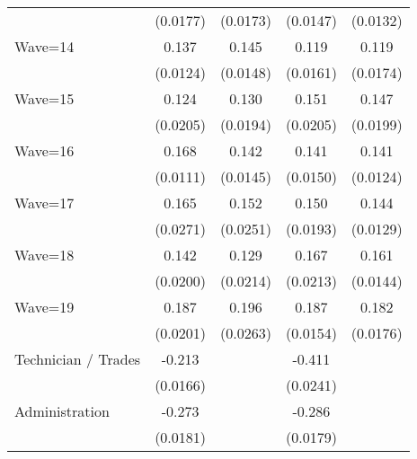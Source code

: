 {\begin{tabular}{l*{4}{c}}
                    &    (0.0177)         &    (0.0173)         &    (0.0147)         &    (0.0132)         \\
[1em]
Wave=14             &       0.137\sym{***}&       0.145\sym{***}&       0.119\sym{***}&       0.119\sym{***}\\
                    &    (0.0124)         &    (0.0148)         &    (0.0161)         &    (0.0174)         \\
[1em]
Wave=15             &       0.124\sym{***}&       0.130\sym{***}&       0.151\sym{***}&       0.147\sym{***}\\
                    &    (0.0205)         &    (0.0194)         &    (0.0205)         &    (0.0199)         \\
[1em]
Wave=16             &       0.168\sym{***}&       0.142\sym{***}&       0.141\sym{***}&       0.141\sym{***}\\
                    &    (0.0111)         &    (0.0145)         &    (0.0150)         &    (0.0124)         \\
[1em]
Wave=17             &       0.165\sym{***}&       0.152\sym{***}&       0.150\sym{***}&       0.144\sym{***}\\
                    &    (0.0271)         &    (0.0251)         &    (0.0193)         &    (0.0129)         \\
[1em]
Wave=18             &       0.142\sym{***}&       0.129\sym{***}&       0.167\sym{***}&       0.161\sym{***}\\
                    &    (0.0200)         &    (0.0214)         &    (0.0213)         &    (0.0144)         \\
[1em]
Wave=19             &       0.187\sym{***}&       0.196\sym{***}&       0.187\sym{***}&       0.182\sym{***}\\
                    &    (0.0201)         &    (0.0263)         &    (0.0154)         &    (0.0176)         \\
[1em]
Technician / Trades &      -0.213\sym{***}&                     &      -0.411\sym{***}&                     \\
                    &    (0.0166)         &                     &    (0.0241)         &                     \\
[1em]
Administration      &      -0.273\sym{***}&                     &      -0.286\sym{***}&                     \\
                    &    (0.0181)         &                     &    (0.0179)         &                     \\

\end{tabular}}
